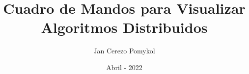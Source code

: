 
\newcommand{\NombreAutor}{Jan Cerezo Pomykol}

\newcommand{\Grado}{Ingeniería Informática}

\newcommand{\TituloTFG}{Cuadro de Mandos para Visualizar Algoritmos Distribuidos}

\newcommand{\NombreTutor}{Fernando Pérez Costoya}

\newcommand{\Departamento}{Departamanto de Arquitectura y Sistemas Informáticos}

\newcommand{\Fecha}{Abril - 2022}

\title{\TituloTFG}
\author{\NombreAutor}
\date{\Fecha}
